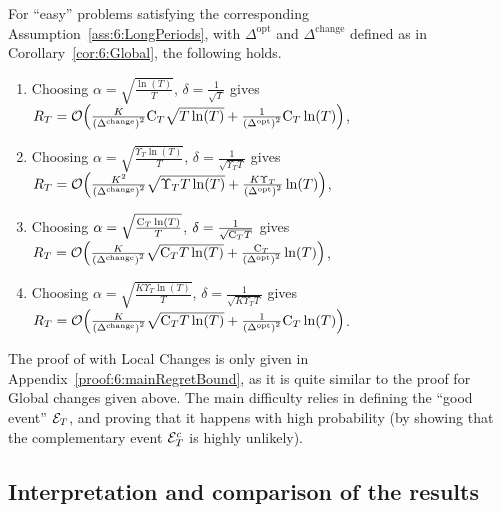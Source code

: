 \begin{corollary}\label{cor:6:Local}
    For ``easy'' problems satisfying the corresponding Assumption~\ref{ass:6:LongPeriods},
    with $\Delta^{\text{opt}}$ and ${\Delta}^{\text{change}}$ defined as in Corollary~\ref{cor:6:Global}, the following holds.
    \begin{enumerate}
        \item Choosing $\alpha = \sqrt{\frac{\ln(T)}{T}}$, $\delta = \frac{1}{\sqrt{T}}$ gives $R_T = \mathop{}\mathopen{}\mathcal{O}\mathopen{}\left(\frac{K}{\left({\Delta}^{\text{change}}\right)^2} \mathrm{C}_T\sqrt{T\ln(T)} + \frac{1}{\left(\Delta^{\text{opt}}\right)^2} \mathrm{C}_T\ln(T)\right)$,
        \item Choosing $\alpha = \sqrt{\frac{\Upsilon_T\ln(T)}{T}}$, $\delta = \frac{1}{\sqrt{\Upsilon_T T}}$ gives $R_T = \mathop{}\mathopen{}\mathcal{O}\mathopen{}\left(\frac{K^2}{\left({\Delta}^{\text{change}}\right)^2}\sqrt{\Upsilon_T T\ln(T)} + \frac{K\Upsilon_T}{\left(\Delta^{\text{opt}}\right)^2}\ln(T)\right)$,
        \item Choosing $\alpha = \sqrt{\frac{\mathrm{C}_T\ln(T)}{T}}$, $\delta = \frac{1}{\sqrt{\mathrm{C}_T T}}$ gives $R_T = \mathop{}\mathopen{}\mathcal{O}\mathopen{}\left(\frac{K}{\left({\Delta}^{\text{change}}\right)^2}\sqrt{\mathrm{C}_T T\ln(T)} + \frac{\mathrm{C}_T}{\left(\Delta^{\text{opt}}\right)^2}\ln(T)\right)$,
        \item Choosing $\alpha = \sqrt{\frac{K\Upsilon_T\ln(T)}{T}}$, $\delta = \frac{1}{\sqrt{K\Upsilon_T T}}$ gives $R_T = \mathop{}\mathopen{}\mathcal{O}\mathopen{}\left(\frac{K}{\left({\Delta}^{\text{change}}\right)^2}\sqrt{\mathrm{C}_T T\ln(T)} + \frac{1}{\left(\Delta^{\text{opt}}\right)^2} \mathrm{C}_T\ln(T)\right)$.
    \end{enumerate}
\end{corollary}

The proof of \GLRklUCB{} with Local Changes is only given in Appendix~\ref{proof:6:mainRegretBound}, as it is quite similar to the proof for Global changes given above. The main difficulty relies in defining the ``good event'' $\mathcal{E}_T$, and proving that it happens with high probability (by showing that the complementary event $\mathcal{E}_T^c$ is highly unlikely).


\subsection{Interpretation and comparison of the results}
\label{sub:6:interpretationRegretBounds}

